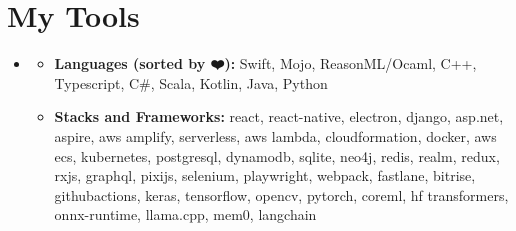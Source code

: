 \section{\sectionheading My Tools}

\begin{itemize}[leftmargin=0pt, label={}]%

\item{
{\sectionheading\large{\textbf{}}}

    \vspace{-12pt}
    \begin{itemize}[label=\textbullet, leftmargin=*, noitemsep]
        \item{\textbf{Languages (sorted by ❤️):} Swift, Mojo, ReasonML/Ocaml, C++, Typescript, C\#, Scala, Kotlin, Java, Python}
        \item{\textbf{Stacks and Frameworks:} react, react-native, electron, django, asp.net, aspire, aws amplify, serverless, aws lambda, cloudformation, docker, aws ecs, kubernetes, postgresql, dynamodb, sqlite, neo4j, redis, realm, redux, rxjs, graphql, pixijs, selenium, playwright, webpack, fastlane, bitrise, githubactions, keras, tensorflow, opencv, pytorch, coreml, hf transformers, onnx-runtime, llama.cpp, mem0, langchain}
    \end{itemize}
}

\end{itemize}
